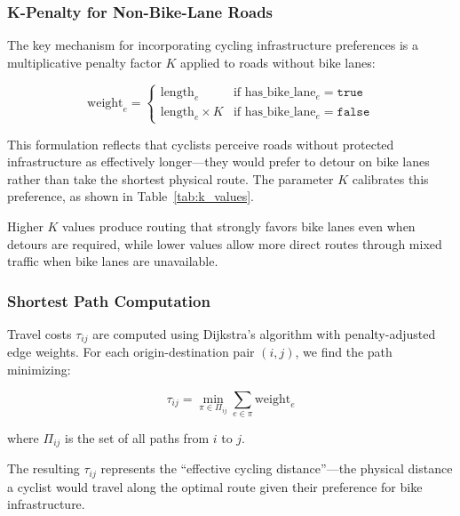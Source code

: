 \documentclass[12pt,a4paper]{article}
\begin{document}
\subsubsection{K-Penalty for Non-Bike-Lane Roads}

The key mechanism for incorporating cycling infrastructure preferences is a multiplicative penalty factor $K$ applied to roads without bike lanes:

\begin{equation}
\text{weight}_e =
\begin{cases}
\text{length}_e & \text{if } \text{has\_bike\_lane}_e = \texttt{true} \\
\text{length}_e \times K & \text{if } \text{has\_bike\_lane}_e = \texttt{false}
\end{cases}
\label{eq:k_penalty}
\end{equation}

This formulation reflects that cyclists perceive roads without protected infrastructure as effectively longer---they would prefer to detour on bike lanes rather than take the shortest physical route. The parameter $K$ calibrates this preference, as shown in Table~\ref{tab:k_values}.



Higher $K$ values produce routing that strongly favors bike lanes even when detours are required, while lower values allow more direct routes through mixed traffic when bike lanes are unavailable.

\subsubsection{Shortest Path Computation}

Travel costs $\tau_{ij}$ are computed using Dijkstra's algorithm with penalty-adjusted edge weights. For each origin-destination pair $(i, j)$, we find the path minimizing:

\begin{equation}
\tau_{ij} = \min_{\pi \in \Pi_{ij}} \sum_{e \in \pi} \text{weight}_e
\label{eq:shortest_path}
\end{equation}

\noindent where $\Pi_{ij}$ is the set of all paths from $i$ to $j$.

The resulting $\tau_{ij}$ represents the ``effective cycling distance''---the physical distance a cyclist would travel along the optimal route given their preference for bike infrastructure.
\end{document}
